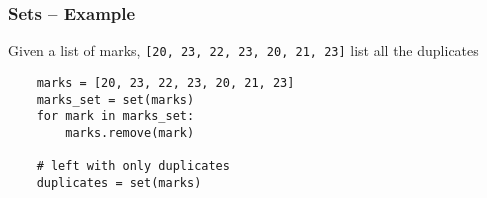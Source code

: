 \begin{frame}[fragile]
  \frametitle{Sets -- Example}
  \begin{block}{}
    Given a list of marks, \texttt{[20, 23, 22, 23, 20, 21, 23]} list
    all the duplicates
  \end{block}
  \begin{lstlisting}
    marks = [20, 23, 22, 23, 20, 21, 23] 
    marks_set = set(marks)
    for mark in marks_set:
        marks.remove(mark)

    # left with only duplicates
    duplicates = set(marks)
  \end{lstlisting}
\end{frame}

